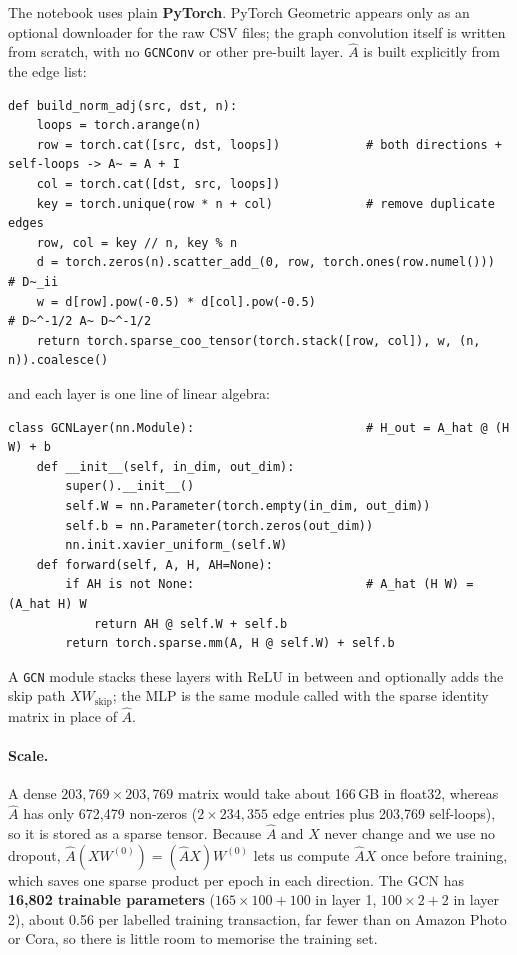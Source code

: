 \documentclass[11pt,a4paper]{article}
\newcommand{\Ahat}{\hat{A}}
\begin{document}
\noindent The notebook uses plain \textbf{PyTorch}. PyTorch Geometric \cite{pyg} appears only as an optional downloader for the raw CSV files; the
graph convolution itself is written from scratch, with no \texttt{GCNConv} or other pre-built layer. $\Ahat$ is built explicitly from
the edge list:
\begin{lstlisting}
def build_norm_adj(src, dst, n):
    loops = torch.arange(n)
    row = torch.cat([src, dst, loops])            # both directions + self-loops -> A~ = A + I
    col = torch.cat([dst, src, loops])
    key = torch.unique(row * n + col)             # remove duplicate edges
    row, col = key // n, key % n
    d = torch.zeros(n).scatter_add_(0, row, torch.ones(row.numel()))   # D~_ii
    w = d[row].pow(-0.5) * d[col].pow(-0.5)                             # D~^-1/2 A~ D~^-1/2
    return torch.sparse_coo_tensor(torch.stack([row, col]), w, (n, n)).coalesce()
\end{lstlisting}
and each layer is one line of linear algebra:
\begin{lstlisting}
class GCNLayer(nn.Module):                        # H_out = A_hat @ (H W) + b
    def __init__(self, in_dim, out_dim):
        super().__init__()
        self.W = nn.Parameter(torch.empty(in_dim, out_dim))
        self.b = nn.Parameter(torch.zeros(out_dim))
        nn.init.xavier_uniform_(self.W)
    def forward(self, A, H, AH=None):
        if AH is not None:                        # A_hat (H W) = (A_hat H) W
            return AH @ self.W + self.b
        return torch.sparse.mm(A, H @ self.W) + self.b
\end{lstlisting}
A \texttt{GCN} module stacks these layers with ReLU in between and optionally adds the skip path $XW_{\text{skip}}$; the MLP is the
same module called with the sparse identity matrix in place of $\Ahat$.

\paragraph{Scale.} A dense $203{,}769\times203{,}769$ matrix would take about 166\,GB in float32, whereas $\Ahat$ has only 672,479
non-zeros ($2\times234{,}355$ edge entries plus 203,769 self-loops), so it is stored as a sparse tensor. Because $\Ahat$ and $X$ never
change and we use no dropout, $\Ahat(XW^{(0)}) = (\Ahat X)W^{(0)}$ lets us compute $\Ahat X$ once before training, which saves one
sparse product per epoch in each direction. The GCN has \textbf{16,802 trainable parameters} ($165\times100+100$ in layer 1,
$100\times2+2$ in layer 2), about 0.56 per labelled training transaction, far fewer than on Amazon Photo or Cora, so there is little
room to memorise the training set.
\end{document}
